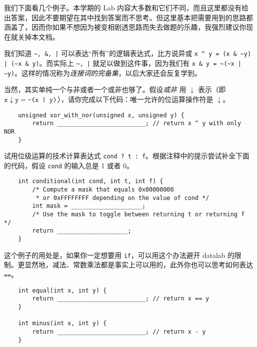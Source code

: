     我们下面看几个例子。本学期的 Lab 内容大多数和它们不同，而且这里都没有给出答案，因此不要期望在其中找到答案而不思考。但这里基本把需要用到的思路都涵盖了，因而你如果不想因为被变相剧透思路而失去做题的乐趣，我强烈建议你现在就关掉本文档。

    \begin{example}[de Morgan 律]
        我们知道 \verb+~, &, |+ 可以表达“所有”的逻辑表达式，比方说异或 \verb+x ^ y = (x & ~y) | (~x & y)+。而实际上 \verb+~, |+ 就足以做到这件事，因为我们有 \verb+x & y = ~(~x | ~y)+。这样的情况称为\emph{连接词的完备集}，以后大家还会反复学到。

        当然，其实单纯一个与非或者一个或非也够了。假设\emph{或非} 用 $\downarrow$ 表示（即 $\texttt{x} \downarrow \texttt{y} = \verb+~(x | y)+$），请你完成以下代码：唯一允许的位运算操作符是 $\downarrow$。
        \begin{verbatim}
    unsigned xor_with_nor(unsigned x, unsigned y) {
        return _________________________; // return x ^ y with only NOR
    }
        \end{verbatim}
    \end{example}

    \begin{example}[表达式]
        试用位级运算的技术计算表达式 \texttt{cond ? t : f}。根据注释中的提示尝试补全下面的代码，假设 \texttt{cond} 的输入总是 1 或者 0。
        \begin{verbatim}
    int conditional(int cond, int t, int f) {
        /* Compute a mask that equals 0x00000000
         * or 0xFFFFFFFF depending on the value of cond */
        int mask = ____________________;
        /* Use the mask to toggle between returning t or returning f */
        return ____________________;
    }
        \end{verbatim}
        这个例子的用处是，如果你一定想要用 \texttt{if}，可以用这个办法避开 datalab 的限制。更显然地，减法、常数乘法都是事实上可以用的，此外你也可以思考如何表达 \texttt{==}。
        \begin{verbatim}
    int equal(int x, int y) {
        return _________________________; // return x == y
    }

    int minus(int x, int y) {
        return _________________________; // return x - y
    }
        \end{verbatim}
    \end{example}

